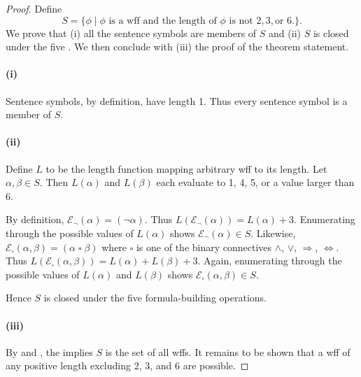 \documentclass{report}
\begin{document}
  \begin{proof}

    Define $$S = \{ \phi \mid
      \phi \text{ is a wff and the length of } \phi
        \text{ is not } 2, 3, \text{or } 6. \}.$$
    We prove that (i) all the sentence symbols are members of $S$ and (ii)
      $S$ is closed under the five .
    We then conclude with (iii) the proof of the theorem statement.

    \paragraph{(i)}%

      Sentence symbols, by definition, have length 1.
      Thus every sentence symbol is a member of $S$.

    \paragraph{(ii)}%

      Define $L$ to be the length function mapping arbitrary wff to its length.
      Let $\alpha, \beta \in S$.
      Then $L(\alpha)$ and $L(\beta)$ each evaluate to 1, 4, 5, or a value
        larger than 6.

      By definition, $\mathcal{E}_{\neg}(\alpha) = (\neg \alpha)$.
      Thus $L(\mathcal{E}_{\neg}(\alpha)) = L(\alpha) + 3$.
      Enumerating through the possible values of $L(\alpha)$ shows
        $\mathcal{E}_{\neg}(\alpha) \in S$.
      Likewise,
        $\mathcal{E}_{\square}(\alpha, \beta) = (\alpha \mathop{\square} \beta)$
        where $\square$ is one of the binary connectives $\land$, $\lor$,
          $\Rightarrow$, $\Leftrightarrow$.
      Thus $L(\mathcal{E}_{\square}(\alpha, \beta)) = L(\alpha) + L(\beta) + 3$.
      Again, enumerating through the possible values of $L(\alpha)$ and
        $L(\beta)$ shows $\mathcal{E}_{\square}(\alpha, \beta) \in S$.

      Hence $S$ is closed under the five formula-building operations.

    \paragraph{(iii)}%

      By  and , the
         implies $S$ is the set of all wffs.
      It remains to be shown that a wff of any positive length excluding 2, 3,
        and 6 are possible.


\end{proof}
\end{document}
